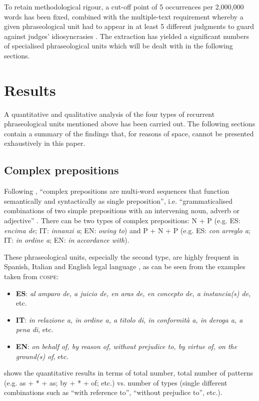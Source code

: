 \documentclass[output=paper]{LSP/langsci}
\begin{document}
To retain methodological rigour, a cut-off point of 5 occurrences per 2,000,000 words has been fixed, combined with the multiple-text requirement whereby a given phraseological unit had to appear in at least 5 different judgments to guard against judges’ idiosyncrasies \citep[110]{GozdzRoszkowski2011}.
The extraction has yielded a significant numbers of specialised phraseological units which will be dealt with in the following sections.

\section{Results}
A quantitative and qualitative analysis of the four types of recurrent phraseological units mentioned above has been carried out. The following sections contain a summary of the findings that, for reasons of space, cannot be presented exhaustively in this paper.
\subsection{Complex prepositions}
Following \citet[75]{Biber1999}, “complex prepositions are multi-word sequences that function semantically and syntactically as single preposition”, i.e. “grammaticalised combinations of two simple prepositions with an intervening noun, adverb or adjective” \citep[44]{Granger2008}. There can be two types of complex prepositions: N + P (e.g. ES: \textit{encima de}; IT: \textit{innanzi a}; EN: \textit{owing to}) and P + N + P (e.g. ES: \textit{con arreglo a}; IT: \textit{in ordine a}; EN: \textit{in accordance with}).

These phraseological units, especially the second type, are highly frequent in Spanish, Italian and English legal language \citep[see][]{Pontrandolfo2013b}, as can be seen from the examples taken from \textsc{cospe}:

\begin{itemize}
\item \textbf{ES}: \textit{al amparo de, a juicio de, en aras de, en concepto de, a instancia(s) de}, etc.
\item \textbf{IT}: \textit{in relazione a, in ordine a, a titolo di, in conformità a, in deroga a, a pena di}, etc.
\item \textbf{EN}: \textit{on behalf of, by reason of, without prejudice to, by virtue of, on the ground(s) of}, etc.
\end{itemize}

 shows the quantitative results in terms of total number, total number of patterns (e.g. as + * + as; by + * + of; etc.) vs. number of types (single different combinations such as “with reference to”, “without prejudice to”, etc.).
\end{document}

